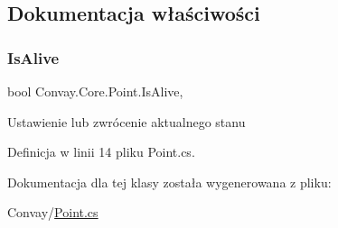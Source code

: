 \subsection{Dokumentacja właściwości}
\hypertarget{class_convay_1_1_core_1_1_point_a03a544f933a7f068f635b7a33d790caa}{}\label{class_convay_1_1_core_1_1_point_a03a544f933a7f068f635b7a33d790caa} 
\subsubsection{\texorpdfstring{Is\+Alive}{IsAlive}}
{\footnotesize\ttfamily bool Convay.\+Core.\+Point.\+Is\+Alive\hspace{0.3cm}{\ttfamily [get]}, {\ttfamily [set]}}



Ustawienie lub zwrócenie aktualnego stanu 



Definicja w linii 14 pliku Point.\+cs.



Dokumentacja dla tej klasy została wygenerowana z pliku\+:\begin{DoxyCompactItemize}
\item 
Convay/\hyperlink{_point_8cs}{Point.\+cs}\end{DoxyCompactItemize}
